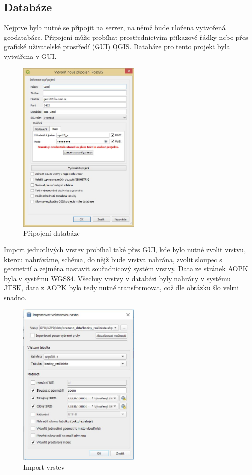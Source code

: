 \documentclass[a4paper, 12pt]{article}
\begin{document}
\subsection{Databáze}
Nejprve bylo nutné se připojit na server, na němž bude uložena vytvořená geodatabáze. Připojení může probíhat prostřednictvím příkazové řádky nebo přes grafické uživatelské prostředí (GUI) QGIS. Databáze pro tento projekt byla vytvářena v GUI. 

\begin{figure}[h!]
	\centering
	\includegraphics[width=6cm]{pictures/pripojeni.jpg}
	\caption{Připojení databáze}
\end{figure}

Import jednotlivých vrstev probíhal také přes GUI, kde bylo nutné zvolit vrstvu, kterou nahráváme, schéma, do nějž bude vrstva nahrána, zvolit sloupec s geometrií a zejména nastavit souřadnicový systém vrstvy. Data ze stránek AOPK byla v systému WGS84. Všechny vrstvy v databázi byly nahrány v systému JTSK, data z AOPK bylo tedy nutné transformovat, což dle obrázku šlo velmi snadno.


\begin{figure}[h!]
	\centering
	\includegraphics[width=6cm]{pictures/import.jpg}
	\caption{Import vrstev}
\end{figure}
\end{document}
